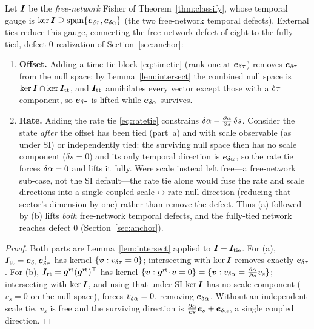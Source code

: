 \begin{theorem}
\label{thm:lift}
Let $\bm{I}$ be the \emph{free-network} Fisher of Theorem~\ref{thm:classify}, whose temporal
gauge is $\ker\bm{I}\supseteq\operatorname{span}\{\bm e_{\delta\tau},\bm e_{\delta\alpha}\}$ (the two
free-network temporal defects). External ties reduce this gauge, connecting the free-network
defect of eight to the fully-tied, defect-$0$ realization of Section~\ref{sec:anchor}:
\begin{enumerate}
\item[(a)] \textbf{Offset.} Adding a time-tie block \eqref{eq:timetie} (rank-one at
$\bm e_{\delta\tau}$) removes $\bm e_{\delta\tau}$ from the null space: by Lemma~\ref{lem:intersect} the
combined null space is $\ker\bm{I}\cap\ker\bm{I}_{\mathrm{tt}}$, and $\bm{I}_{\mathrm{tt}}$
annihilates every vector except those with a $\delta\tau$ component, so $\bm e_{\delta\tau}$ is lifted
while $\bm e_{\delta\alpha}$ survives.
\item[(b)] \textbf{Rate.} Adding the rate tie \eqref{eq:ratetie} constrains
$\delta\alpha-\tfrac{\partial\alpha}{\partial s}\,\delta s$. Consider the state \emph{after} the
offset has been tied (part~a) and with scale observable (as under SI) or independently tied:
the surviving null space then has no scale component ($\delta s=0$) and its only temporal
direction is $\bm e_{\delta\alpha}$, so the rate tie forces $\delta\alpha=0$ and lifts it fully. Were
scale instead left free---a free-network sub-case, not the SI default---the rate tie alone
would fuse the rate and scale directions into a single coupled scale$\leftrightarrow$rate
null direction (reducing that sector's dimension by one) rather than remove the defect. Thus
(a) followed by (b) lifts \emph{both} free-network temporal defects, and the fully-tied
network reaches defect $0$ (Section~\ref{sec:anchor}).
\end{enumerate}
\end{theorem}

\begin{proof}
Both parts are Lemma~\ref{lem:intersect} applied to $\bm{I}+\bm{I}_{\mathrm{tie}}$. For (a),
$\bm{I}_{\mathrm{tt}}=\bm e_{\delta\tau}\bm e_{\delta\tau}^\top$ has kernel
$\{\bm v:v_{\delta\tau}=0\}$; intersecting with $\ker\bm{I}$ removes exactly $\bm e_{\delta\tau}$. For
(b), $\bm{I}_{\mathrm{rt}}=\bm g^{\mathrm{rt}}(\bm g^{\mathrm{rt}})^\top$ has kernel
$\{\bm v:\bm g^{\mathrm{rt}}\!\cdot\!\bm v=0\}=\{\bm v:v_{\delta\alpha}=\tfrac{\partial\alpha}
{\partial s}v_{s}\}$; intersecting with $\ker\bm{I}$, and using that under SI $\ker\bm{I}$ has
no scale component ($v_s=0$ on the null space), forces $v_{\delta\alpha}=0$, removing
$\bm e_{\delta\alpha}$. Without an independent scale tie, $v_s$ is free and the surviving
direction is $\tfrac{\partial\alpha}{\partial s}\bm e_s+\bm e_{\delta\alpha}$, a single coupled
direction.
\end{proof}

